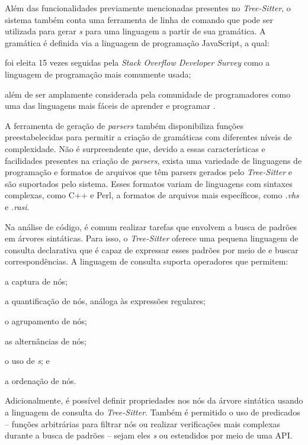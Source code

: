 \documentclass[11pt, openright, twoside, a4paper, english, brazil]{abntex2}
\begin{document}
Além das funcionalidades previamente mencionadas presentes no
\textit{Tree-Sitter}, o sistema também conta uma ferramenta de linha de comando
que pode ser utilizada para gerar \textit{s} para uma linguagem a
partir de sua gramática. A gramática é definida via a linguagem de programação
JavaScript, a qual:
\begin{inparaenum}
	\item foi eleita 15 vezes seguidas pela
	      \textit{Stack Overflow Developer Survey}
	      \cite{stack-overflow-2022-stack} como a linguagem de programação mais
	      comumente usada;
	\item além de ser amplamente considerada pela comunidade de programadores
	      como uma das linguagens mais fáceis de aprender e programar
	      \cites {berkeley-2023-11}{goel-2023-how}{w3schools-2023-javascript}.
\end{inparaenum}
A ferramenta de geração de \textit{parsers} também disponibiliza funções
preestabelecidas para permitir a criação de gramáticas com diferentes níveis de
complexidade. Não é surpreendente que, devido a essas características e
facilidades presentes na criação de \textit{parsers}, exista uma variedade de
linguagens de programação e formatos de arquivos que têm parsers gerados pelo
\textit{Tree-Sitter} e são suportados pelo sistema. Esses formatos variam de
linguagens com sintaxes complexas, como C++ e Perl, a formatos de arquivos mais
específicos, como \textit{.vhs} e \textit{.rasi}.

Na análise de código, é comum realizar tarefas que envolvem a busca de padrões
em árvores sintáticas. Para isso, o \textit{Tree-Sitter} oferece uma pequena
linguagem de consulta declarativa que é capaz de expressar esses padrões por
meio de \textit{} e buscar correspondências. A linguagem de
consulta suporta operadores que permitem:
\begin{inparaenum}
	\item a captura de nós;
	\item a quantificação de nós, análoga às expressões regulares;
	\item o agrupamento de nós;
	\item as alternâncias de nós;
	\item o uso de \textit{s}; e
	\item a ordenação de nós.
\end{inparaenum}
Adicionalmente, é possível definir propriedades nos nós da árvore sintática
usando a linguagem de consulta do \textit{Tree-Sitter}. Também é permitido o
uso de predicados -- funções arbitrárias para filtrar nós ou realizar
verificações mais complexas durante a busca de padrões -- sejam eles
\textit{s} ou estendidos por meio de uma API.
\end{document}

